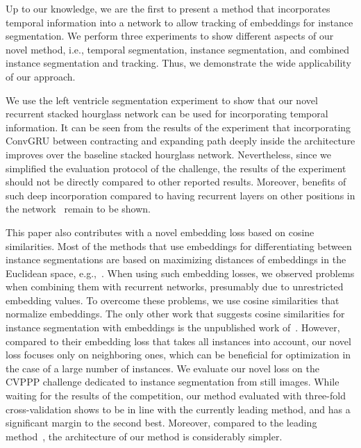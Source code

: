 \documentclass[runningheads,a4paper]{llncs}
\begin{document}
Up to our knowledge, we are the first to present a method that incorporates temporal information into a network to allow tracking of embeddings for instance segmentation.
We perform three experiments to show different aspects of our novel method, i.e., temporal segmentation, instance segmentation, and combined instance segmentation and tracking. %
Thus, we demonstrate the wide applicability of our approach.

We use the left ventricle segmentation experiment to show that our novel recurrent stacked hourglass network can be used for incorporating temporal information.
It can be seen from the results of the experiment that incorporating ConvGRU between contracting and expanding path deeply inside the architecture improves over the baseline stacked hourglass network.
Nevertheless, since we simplified the evaluation protocol of the challenge, the results of the experiment should not be directly compared to other reported results.
Moreover, benefits of such deep incorporation compared to having recurrent layers on other positions in the network~\cite{Ren2017} remain to be shown.

This paper also contributes with a novel embedding loss based on cosine similarities.
Most of the methods that use embeddings for differentiating between instance segmentations are based on maximizing distances of embeddings in the Euclidean space, e.g.,~\cite{Newell2017}.
When using such embedding losses, we observed problems when combining them with recurrent networks, presumably due to unrestricted embedding values.
To overcome these problems, we use cosine similarities that normalize embeddings.
The only other work that suggests cosine similarities for instance segmentation with embeddings is the unpublished work of~\cite{Kong2017}.
However, compared to their embedding loss that takes all instances into account, our novel loss focuses only on neighboring ones, which can be beneficial for optimization in the case of a large number of instances.
We evaluate our novel loss on the CVPPP challenge dedicated to instance segmentation from still images.
While waiting for the results of the competition, our method evaluated with three-fold cross-validation shows to be in line with the currently leading method, and has a significant margin to the second best.
Moreover, compared to the leading method~\cite{Ren2017}, the architecture of our method is considerably simpler. 
\end{document}
